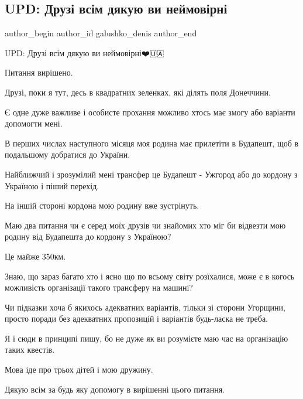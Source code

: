  
 
 
 
 

\subsection{UPD:  Друзі всім дякую ви неймовірні}
\label{sec:24_10_2022.fb.galushko_denis.1.upd___druz__vs_m_dya}

\ifcmt
 author_begin
   author_id galushko_denis
 author_end
\fi

UPD:  Друзі всім дякую ви неймовірні❤️🇺🇦

Питання вирішено.

Друзі, поки я тут, десь в квадратних зеленках, які ділять поля Донеччини.

Є одне дуже важливе і особисте прохання можливо хтось має змогу або варіанти
допомогти мені.

В перших числах наступного місяця моя родина має прилетіти в Будапешт, щоб в
подальшому добратися до України.    

Найближчий і зрозумілий мені  трансфер це Будапешт - Ужгород або до кордону з
Україною і піший перехід.

На іншій стороні кордона мою родину вже зустрінуть. 

Маю два питання чи є серед моїх друзів чи знайомих хто міг би відвезти мою
родину від Будапешта до кордону з Україною? 

Це майже 350км.

Знаю, що зараз багато хто і ясно що по всьому світу розїхалися, може є в когось
можливість організації такого трансферу на машині? 

Чи підказки хоча б якихось адекватних варіантів, тільки зі сторони Угорщини,
просто поради без адекватних пропозицій і варіантів будь-ласка не треба.

Я і сюди в принципі пишу, бо не дуже як ви розумієте маю час на організацію
таких квестів. 

Мова іде про трьох дітей і мою дружину.

Дякую всім за будь яку допомогу в вирішенні цього питання.
